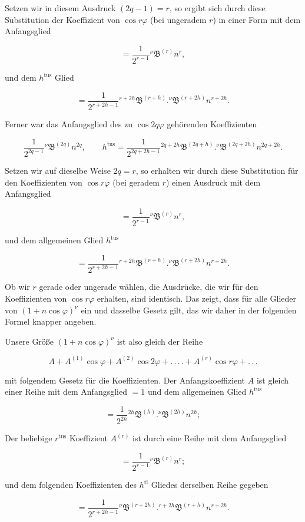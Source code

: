 \par\noindent{}%
Setzen wir in diesem Ausdruck $(2q-1) = r$, so ergibt sich durch diese Substitution der Koeffizient von $\cos r\varphi$ (bei ungeradem $r$) in einer Form mit dem Anfangsglied

\[
= \frac{1}{2^{r-1}} {}^{\nu}\mathfrak{B}^{(r)} n^{r},
\]

\noindent und dem $h^{\text{tus}}$ Glied

\[
= \frac{1}{2^{r+2h-1}} {}^{r+2h}\mathfrak{B}^{(r+h)}  .  {}^{\nu}\mathfrak{B}^{(r+2h)} n^{r+2h}.
\]

\noindent Ferner war das Anfangsglied des zu $\cos 2q\varphi$ gehörenden Koeffizienten

\[
\frac{1}{2^{2q-1}} {}^{\nu}\mathfrak{B}^{(2q)} n^{2q}, \qquad h^{\text{tus}} = \frac{1}{2^{2q+2h-1}} {}^{2q+2h}\mathfrak{B}^{(2q+h)}  .  {}^{\nu}\mathfrak{B}^{(2q+2h)} n^{2q+2h}.
\]

\noindent Setzen wir auf dieselbe Weise $2q = r$, so erhalten wir durch diese Substitution für den Koeffizienten von $\cos r\varphi$ (bei geradem $r$) einen Ausdruck mit dem Anfangsglied

\[
= \frac{1}{2^{r-1}} {}^{\nu}\mathfrak{B}^{(r)} n^{r},
\]

\noindent und dem allgemeinen Glied $h^{\text{tus}}$

\[
= \frac{1}{2^{r+2h-1}} {}^{r+2h}\mathfrak{B}^{(r+h)}  .  {}^{\nu}\mathfrak{B}^{(r+2h)} n^{r+2h}.
\]

\noindent Ob wir $r$ gerade oder ungerade wählen, die Ausdrücke, die wir für den Koeffizienten von $\cos r\varphi$ erhalten, sind identisch. Das zeigt, dass für alle Glieder von $(1+n\cos\varphi)^{\nu}$ ein und dasselbe Gesetz gilt, das wir daher in der folgenden Formel knapper angeben.

Unsere Größe $(1+n\cos\varphi)^{\nu}$ ist also gleich der Reihe

\[
A + A^{(1)}\cos\varphi + A^{(2)}\cos 2\varphi + .\,.\,.\,. + A^{(r)}\cos r\varphi + .\,.\,.
\]

\noindent mit folgendem Gesetz für die Koeffizienten. Der Anfangskoeffizient $A$ ist gleich einer Reihe mit dem Anfangsglied $=1$ und dem allgemeinen Glied $h^{\text{tus}}$

\[
= \frac{1}{2^{2h}} {}^{2h}\mathfrak{B}^{(h)}  .  {}^{\nu}\mathfrak{B}^{(2h)} n^{2h};
\]

\noindent Der beliebige $r^{\text{tus}}$ Koeffizient $A^{(r)}$ ist durch eine Reihe mit dem Anfangsglied

\[
= \frac{1}{2^{r-1}} {}^{\nu}\mathfrak{B}^{(r)} n^{r};
\]

\noindent und dem folgenden Koeffizienten des $h^{\text{ti}}$ Gliedes derselben Reihe gegeben

\[
= \frac{1}{2^{r+2h-1}} {}^{\nu}\mathfrak{B}^{(r+2h)}  .  {}^{r+2h}\mathfrak{B}^{(r+h)} n^{r+2h}.
\]
